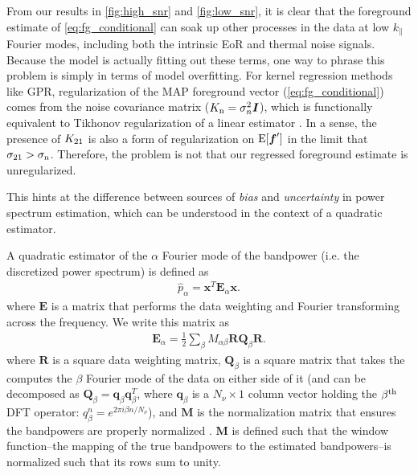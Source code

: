 \documentclass[a4paper,fleqn,usenatbib]{mnras}
\def\para{\parallel}
\def\E{\boldsymbol{E}}
\def\f{\boldsymbol{f}}
\def\R{\boldsymbol{R}}
\def\x{\boldsymbol{x}}
\def\q{\boldsymbol{q}}
\def\Q{\boldsymbol{Q}}
\def\M{\boldsymbol{M}}
\def\I{\boldsymbol{I}}
\def\Exp{{\rm E}}
\def\Kto{K_{\rm 21}}
\def\Kn{K_{\rm n}}
\def\sigman{\sigma_{\rm n}}
\def\sigmato{\sigma_{\rm 21}}
\begin{document}
From our results in \autoref{fig:high_snr} and \autoref{fig:low_snr}, it is clear that the foreground estimate of \autoref{eq:fg_conditional} can soak up other processes in the data at low $k_\para$ Fourier modes, including both the intrinsic EoR and thermal noise signals.
Because the model is actually fitting out these terms, one way to phrase this problem is simply in terms of model overfitting.
For kernel regression methods like GPR, regularization of the MAP foreground vector (\autoref{eq:fg_conditional}) comes from the noise covariance matrix ($\Kn = \sigma_n^2\I$), which is functionally equivalent to Tikhonov regularization of a linear estimator \citep{Ohagan1978, Mackay1992, Rasmussen2006}.
In a sense, the presence of $\Kto$ is also a form of regularization on $\Exp[\f^\prime]$ in the limit that $\sigmato > \sigman$.
Therefore, the problem is not that our regressed foreground estimate is unregularized.


This hints at the difference between sources of \emph{bias} and \emph{uncertainty} in power spectrum estimation, which can be understood in the context of a quadratic estimator.

A quadratic estimator of the $\alpha$ Fourier mode of the bandpower (i.e. the discretized power spectrum) is defined as
\begin{align}
\hat{p}_\alpha = \x^T\E_\alpha\x.
\end{align}
where $\E$ is a matrix that performs the data weighting and Fourier transforming across the frequency.
We write this matrix as
\begin{align}
\E_\alpha = \frac{1}{2}\sum_\beta M_{\alpha\beta}\R \Q_\beta \R.
\end{align}
where $\R$ is a square data weighting matrix, $\Q_\beta$ is a square matrix that takes the computes the $\beta$ Fourier mode of the data on either side of it (and can be decomposed as $\Q_\beta = \q_\beta\q_\beta^T$, where $\q_\beta$ is a $N_\nu\times1$ column vector holding the $\beta^{\rm th}$ DFT operator: $q_\beta^n = e^{2\pi i\beta n / N_{\nu}}$), and $\M$ is the normalization matrix that ensures the bandpowers are properly normalized \citep{Tegmark1997, Liu2011, Dillon2013}.
$\M$ is defined such that the window function--the mapping of the true bandpowers to the estimated bandpowers--is normalized such that its rows sum to unity.
\end{document}
